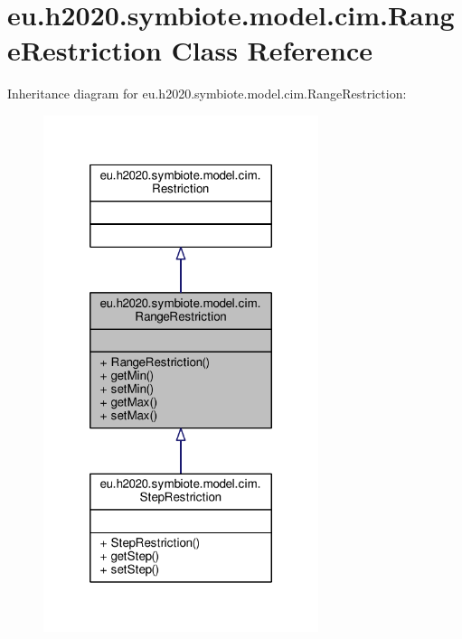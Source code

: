 \hypertarget{classeu_1_1h2020_1_1symbiote_1_1model_1_1cim_1_1RangeRestriction}{}\section{eu.\+h2020.\+symbiote.\+model.\+cim.\+Range\+Restriction Class Reference}
\label{classeu_1_1h2020_1_1symbiote_1_1model_1_1cim_1_1RangeRestriction}


Inheritance diagram for eu.\+h2020.\+symbiote.\+model.\+cim.\+Range\+Restriction\+:
\nopagebreak
\begin{figure}[H]
\begin{center}
\leavevmode
\includegraphics[width=228pt]{classeu_1_1h2020_1_1symbiote_1_1model_1_1cim_1_1RangeRestriction__inherit__graph}
\end{center}
\end{figure}



